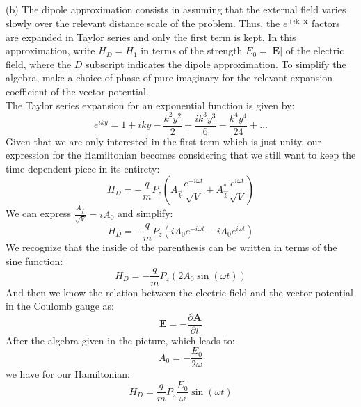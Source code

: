 \documentclass[12pt]{article}
\begin{document}
\subsection{}
(b) The dipole approximation consists in assuming that the external field varies slowly over the relevant distance scale of the problem. Thus, the $e^{ \pm i \mathbf{k} \cdot \mathbf{x}}$ factors are expanded in Taylor series and only the first term is kept. In this approximation, write $H_D=H_1$ in terms of the strength $E_0=|\mathbf{E}|$ of the electric field, where the $D$ subscript indicates the dipole approximation. To simplify the algebra, make a choice of phase of pure imaginary for the relevant expansion coefficient of the vector potential. \\
The Taylor series expansion for an exponential function is given by:
\begin{equation}
  e^{i k y} = 1 + i k y - \frac{k^2 y^2}{2} + \frac{i k^3 y^3}{6} - \frac{k^4 y^4}{24} + \ldots
\end{equation}
Given that we are only interested in the first term which is just unity, our expression for the Hamiltonian becomes considering that we still want to keep the time dependent piece in its entirety:
\begin{equation}
  H_D = -\frac{q}{m} P_z \left( A_{\vec{k}} \frac{e^{-i\omega t}}{\sqrt{V}} + A_{\vec{k}}^{*} \frac{e^{i\omega t}}{\sqrt{V}} \right)
\end{equation}
We can express $\frac{A_{\vec{k}}}{\sqrt{V}} = i A_0$ and simplify:
\begin{equation}
  H_D = -\frac{q}{m} P_z \left( i A_0 e^{-i\omega t} - i A_0 e^{i\omega t} \right)
\end{equation} 
We recognize that the inside of the parenthesis can be written in terms of the sine function:
\begin{equation}
  H_D = -\frac{q}{m} P_z \left( 2 A_0 \sin(\omega t) \right)
\end{equation}
And then we know the relation between the electric field and the vector potential in the Coulomb gauge as:
\begin{equation}
  \mathbf{E} = -\frac{\partial \mathbf{A}}{\partial t}
\end{equation}
After the algebra given in the picture, which leads to:
\begin{equation}
  A_0 = - \frac{E_0}{2\omega}
\end{equation}
we have for our Hamiltonian:
\begin{equation}
  H_D = \frac{q }{m}P_z \frac{E_0}{\omega} \sin(\omega t)
\end{equation}
\end{document}
